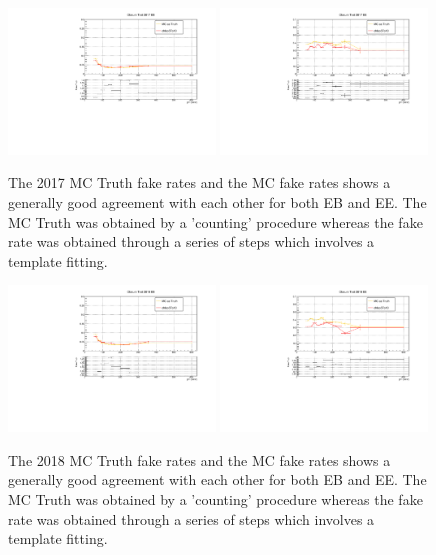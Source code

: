 \begin{figure}[!htbp]
  \centering
  \includegraphics[width=0.49\textwidth]{fig/closureTest_MCTruth_comparisonsEB_2017_adjustrange.pdf}
  \includegraphics[width=0.49\textwidth]{fig/closureTest_MCTruth_comparisonsEE_2017_adjustrange.pdf}
  \caption{The 2017 MC Truth fake rates and the MC fake rates shows a generally good agreement with each other for both EB and EE. The MC Truth was obtained by a 'counting' procedure whereas the fake rate was obtained through a series of steps which involves a template fitting.}
  \label{fig:fakerates_2017}
\end{figure}



\begin{figure}[!htbp]
  \centering
  \includegraphics[width=0.49\textwidth]{fig/closureTest_MCTruth_comparisonsEB_2018_adjustrange.pdf}
  \includegraphics[width=0.49\textwidth]{fig/closureTest_MCTruth_comparisonsEE_2018_adjustrange.pdf}
  \caption{The 2018 MC Truth fake rates and the MC fake rates shows a generally good agreement with each other for both EB and EE. The MC Truth was obtained by a 'counting' procedure whereas the fake rate was obtained through a series of steps which involves a template fitting.}
  \label{fig:fakerates_2018}
\end{figure}

